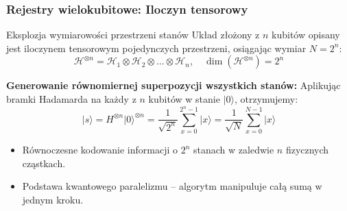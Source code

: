 \documentclass[aspectratio=169]{beamer}
\newcommand{\ket}[1]{\lvert #1 \rangle}
\begin{document}
\begin{frame}
    \frametitle{Rejestry wielokubitowe: Iloczyn tensorowy}

    \begin{block}{Eksplozja wymiarowości przestrzeni stanów}
        Układ złożony z $n$ kubitów opisany jest iloczynem tensorowym pojedynczych przestrzeni, osiągając wymiar $N = 2^n$:
        \begin{equation*}
            \mathcal{H}^{\otimes n} = \mathcal{H}_1 \otimes \mathcal{H}_2 \otimes \dots \otimes \mathcal{H}_n, \quad \dim(\mathcal{H}^{\otimes n}) = 2^n
        \end{equation*}
    \end{block}

    \vspace{0.2cm}
    \textbf{Generowanie równomiernej superpozycji wszystkich stanów:}
    Aplikując bramki Hadamarda na każdy z $n$ kubitów w stanie $\ket{0}$, otrzymujemy:
    \begin{equation*}
        \ket{s} = H^{\otimes n} \ket{0}^{\otimes n} = \frac{1}{\sqrt{2^n}} \sum_{x=0}^{2^n-1} \ket{x} = \frac{1}{\sqrt{N}} \sum_{x=0}^{N-1} \ket{x}
    \end{equation*}
    \begin{itemize}
        \item Równoczesne kodowanie informacji o $2^n$ stanach w zaledwie $n$ fizycznych cząstkach.
        \item Podstawa kwantowego paralelizmu – algorytm manipuluje całą sumą w jednym kroku.
    \end{itemize}
\end{frame}

\end{document}
